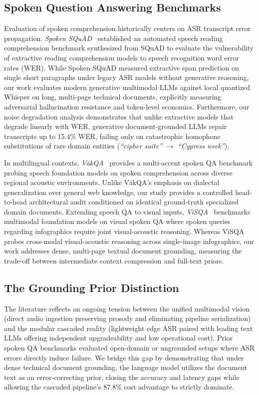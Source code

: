 \documentclass[10pt,a4paper,twocolumn]{article}
\begin{document}
\subsection{Spoken Question Answering Benchmarks}
Evaluation of spoken comprehension historically centers on ASR transcript error propagation. \textit{Spoken SQuAD}~\cite{li-etal-2018-spoken-squad} established an automated speech reading comprehension benchmark synthesized from SQuAD to evaluate the vulnerability of extractive reading comprehension models to speech recognition word error rates (WER). While Spoken SQuAD measured extractive span prediction on single short paragraphs under legacy ASR models without generative reasoning, our work evaluates modern generative multimodal LLMs against local quantized Whisper on long, multi-page technical documents, explicitly measuring adversarial hallucination resistance and token-level economics. Furthermore, our noise degradation analysis demonstrates that unlike extractive models that degrade linearly with WER, generative document-grounded LLMs repair transcripts up to 15.4\% WER, failing only on catastrophic homophone substitutions of rare domain entities (\textit{``cipher suite''} $\to$ \textit{``Cypress week''}).

In multilingual contexts, \textit{V\=akQA}~\cite{roy2024vakqa} provides a multi-accent spoken QA benchmark probing speech foundation models on spoken comprehension across diverse regional acoustic environments. Unlike V\=akQA's emphasis on dialectal generalization over general web knowledge, our study provides a controlled head-to-head architectural audit conditioned on identical ground-truth specialized domain documents. Extending speech QA to visual inputs, \textit{ViSQA}~\cite{saha-etal-2025-visqa} benchmarks multimodal foundation models on visual spoken QA where spoken queries regarding infographics require joint visual-acoustic reasoning. Whereas ViSQA probes cross-modal visual-acoustic reasoning across single-image infographics, our work addresses dense, multi-page textual document grounding, measuring the trade-off between intermediate context compression and full-text priors.

\subsection{The Grounding Prior Distinction}
The literature reflects an ongoing tension between the unified multimodal vision (direct audio ingestion preserving prosody and eliminating pipeline serialization) and the modular cascaded reality (lightweight edge ASR paired with leading text LLMs offering independent upgradeability and low operational cost). Prior spoken QA benchmarks evaluated open-domain or ungrounded setups where ASR errors directly induce failure. We bridge this gap by demonstrating that under dense technical document grounding, the language model utilizes the document text as an error-correcting prior, closing the accuracy and latency gaps while allowing the cascaded pipeline's 87.8\% cost advantage to strictly dominate.
\end{document}
